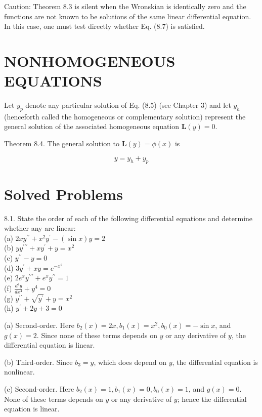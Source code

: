 \documentclass[10pt]{article}
\begin{document}
Caution: Theorem 8.3 is silent when the Wronskian is identically zero and the functions are not known to be solutions of the same linear differential equation. In this case, one must test directly whether Eq. (8.7) is satisfied.

\section*{NONHOMOGENEOUS EQUATIONS}
Let $y_{p}$ denote any particular solution of Eq. (8.5) (see Chapter 3) and let $y_{h}$ (henceforth called the homogeneous or complementary solution) represent the general solution of the associated homogeneous equation $\mathbf{L}(y)=0$.

Theorem 8.4. The general solution to $\mathbf{L}(y)=\phi(x)$ is


\begin{equation*}
y=y_{h}+y_{p} \tag{8.9}
\end{equation*}


\section*{Solved Problems}
8.1. State the order of each of the following differential equations and determine whether any are linear:\\
(a) $2 x y^{\prime \prime}+x^{2} y^{\prime}-(\sin x) y=2$\\
(b) $y y^{\prime \prime \prime}+x y^{\prime}+y=x^{2}$\\
(c) $y^{\prime \prime}-y=0$\\
(d) $3 y^{\prime}+x y=e^{-x^{2}}$\\
(e) $2 e^{x} y^{\prime \prime \prime}+e^{x} y^{\prime \prime}=1$\\
(f) $\frac{d^{4} y}{d x^{4}}+y^{4}=0$\\
(g) $y^{\prime \prime}+\sqrt{y^{\prime}}+y=x^{2}$\\
(h) $y^{\prime}+2 y+3=0$

(a) Second-order. Here $b_{2}(x)=2 x, b_{1}(x)=x^{2}, b_{0}(x)=-\sin x$, and $g(x)=2$. Since none of these terms depends on $y$ or any derivative of $y$, the differential equation is linear.

(b) Third-order. Since $b_{3}=y$, which does depend on $y$, the differential equation is nonlinear.

(c) Second-order. Here $b_{2}(x)=1, b_{1}(x)=0, b_{0}(x)=1$, and $g(x)=0$. None of these terms depends on $y$ or any derivative of $y$; hence the differential equation is linear.
\end{document}
